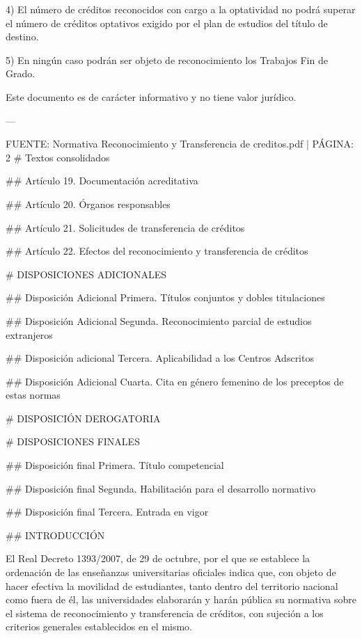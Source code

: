 \documentclass{article}
\begin{document}
\begin{itemize}
\begin{itemize}
\begin{scriptsize}
                  4) El número de créditos reconocidos con cargo a la optatividad no podrá superar el número de créditos optativos exigido por el plan de estudios del título de destino.

                  5) En ningún caso podrán ser objeto de reconocimiento los Trabajos Fin de Grado.

                  Este documento es de carácter informativo y no tiene valor jurídico.

                  ---

                  FUENTE: Normativa Reconocimiento y Transferencia de creditos.pdf | PÁGINA: 2
                  \# Textos consolidados

                  \#\# Artículo 19. Documentación acreditativa

                  \#\# Artículo 20. Órganos responsables

                  \#\# Artículo 21. Solicitudes de transferencia de créditos

                  \#\# Artículo 22. Efectos del reconocimiento y transferencia de créditos

                  \# DISPOSICIONES ADICIONALES

                  \#\# Disposición Adicional Primera. Títulos conjuntos y dobles titulaciones

                  \#\# Disposición Adicional Segunda. Reconocimiento parcial de estudios extranjeros

                  \#\# Disposición adicional Tercera. Aplicabilidad a los Centros Adscritos

                  \#\# Disposición Adicional Cuarta. Cita en género femenino de los preceptos de estas normas

                  \# DISPOSICIÓN DEROGATORIA

                  \# DISPOSICIONES FINALES

                  \#\# Disposición ﬁnal Primera. Título competencial

                  \#\# Disposición ﬁnal Segunda. Habilitación para el desarrollo normativo

                  \#\# Disposición ﬁnal Tercera. Entrada en vigor

                  \#\# INTRODUCCIÓN

                  El Real Decreto 1393/2007, de 29 de octubre, por el que se establece la ordenación de las enseñanzas universitarias oficiales indica que, con objeto de hacer efectiva la movilidad de estudiantes, tanto dentro del territorio nacional como fuera de él, las universidades elaborarán y harán pública su normativa sobre el sistema de reconocimiento y transferencia de créditos, con sujeción a los criterios generales establecidos en el mismo.


\end{scriptsize}
\end{itemize}
\end{itemize}
\end{document}
